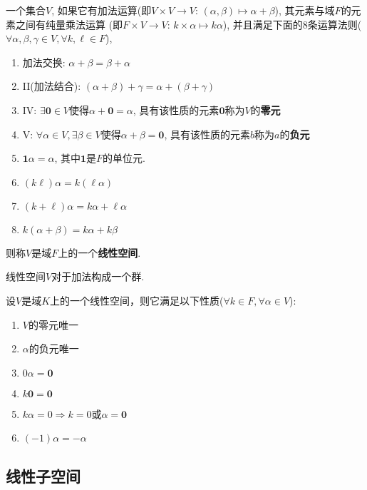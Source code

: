 \begin{Definition}[线性空间]
一个\;\;集合$V$, 如果它有加法运算(即$V \times V \rightarrow V$: $(\alpha, \beta) \mapsto \alpha + \beta$), 其元素与域$F$的元素之间有纯量乘法运算
(即$F \times V \rightarrow V$: $k \times \alpha \mapsto k \alpha$), 并且满足下面的$8$条运算法则($\forall \alpha, \beta, \gamma \in V, 
\forall k, \ell \in F$),
\begin{enumerate}[(1)]
	\item 加法交换: $\alpha + \beta = \beta + \alpha$
	\item II(加法结合): $(\alpha + \beta) + \gamma = \alpha + (\beta + \gamma)$
	\item IV: $\exists \mathbf{0} \in V$使得$\alpha + \mathbf{0} = \alpha$, 具有该性质的元素$\mathbf{0}$称为$V$的\textbf{零元}
	\item V: $\forall \alpha \in V, \exists \beta \in V$使得$\alpha + \beta = \mathbf{0}$, 具有该性质的元素$b$称为$a$的\textbf{负元}
	\item $\mathbf{1} \alpha = \alpha$, 其中$\mathbf{1}$是$F$的单位元.
	\item $(k \ell) \alpha = k (\ell \alpha)$
	\item $(k+\ell) \alpha = k \alpha + \ell \alpha$
	\item $k(\alpha + \beta) = k \alpha + k\beta$
\end{enumerate}
则称$V$是域$F$上的一个\textbf{线性空间}.
\end{Definition}

\begin{Note}
线性空间$V$对于加法构成一个群.
\end{Note}

\begin{Property}
设$V$是域$K$上的一个线性空间，则它满足以下性质($\forall k \in F, \forall \alpha \in V$):
\begin{enumerate}[(1)]
\item $V$的零元唯一
\item $\alpha$的负元唯一
\item $0 \alpha = \mathbf{0}$
\item $k \mathbf{0} = \mathbf{0}$
\item $k \alpha = 0 \Rightarrow k = 0$或$\alpha = \mathbf{0}$
\item $(-1) \alpha = - \alpha$
\end{enumerate}
\end{Property}

\subsection{线性子空间}

